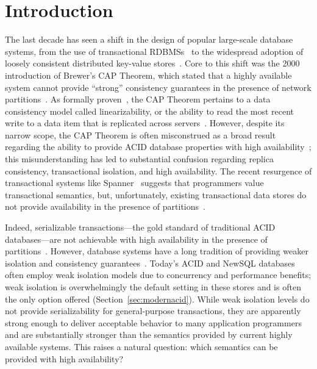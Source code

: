 
\section{Introduction}

The last decade has seen a shift in the design of popular large-scale
database systems, from the use of transactional
RDBMSs~\cite{bernstein-book, gray-isolation, gray-virtues} to the
widespread adoption of loosely consistent distributed key-value
stores~\cite{bigtable, pnuts, dynamo}. Core to this shift was the 2000
introduction of Brewer's CAP Theorem, which stated that a highly
available system cannot provide ``strong'' consistency guarantees in
the presence of network partitions~\cite{brewer-slides}. As formally
proven~\cite{gilbert-cap}, the CAP Theorem pertains to a data
consistency model called linearizability, or the ability to read the
most recent write to a data item that is replicated across
servers~\cite{herlihy-art}. However, despite its narrow scope, the CAP
Theorem is often misconstrued as a broad result regarding the ability
to provide ACID database properties with high
availability~\cite{hat-hotos,brewer-slides, foundation-article}; this
misunderstanding has led to substantial confusion regarding replica
consistency, transactional isolation, and high availability. The
recent resurgence of transactional systems like Spanner~\cite{spanner}
suggests that programmers value transactional semantics, but,
unfortunately, existing transactional data stores do not provide
availability in the presence of partitions~\cite{orleans,foundation-article,
  hstore,spanner,eiger, walter,calvin}.

Indeed, serializable transactions---the gold standard of traditional
ACID databases---are not achievable with high availability in the
presence of partitions~\cite{davidson-survey}. However, database
systems have a long tradition of providing weaker isolation and
consistency guarantees~\cite{adya, ansicritique, gray-virtues,
  gray-isolation, kemme-thesis}. Today's ACID and NewSQL databases
often employ weak isolation models due to concurrency and performance
benefits; weak isolation is overwhelmingly the default setting in
these stores and is often the only option offered
(Section~\ref{sec:modernacid}). While weak isolation levels do not
provide serializability for general-purpose transactions, they are
apparently strong enough to deliver acceptable behavior to many
application programmers and are substantially stronger than the
semantics provided by current highly available systems. This raises a
natural question: which semantics can be provided with high
availability?

